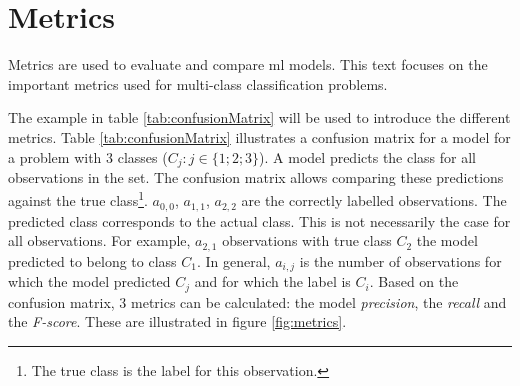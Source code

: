 \section{Metrics}
\par{Metrics are used to evaluate and compare \acrlong{ml} models.
This text focuses on the important metrics used for multi-class classification problems.
}
\par{
    The example in table \ref{tab:confusionMatrix} will be used to introduce the different metrics.
    Table \ref{tab:confusionMatrix} illustrates a confusion matrix for a model for a problem with 3 classes ($C_j:j\in \{1;2;3\}$). 
    A model predicts the class for all observations in the set.
    The confusion matrix allows comparing these predictions against the true class\footnote{The true class is the label for this observation.}.
    $a_{0,0}$, $a_{1,1}$, $a_{2,2}$ are the correctly labelled observations. 
The predicted class corresponds to the actual class.
This is not necessarily the case for all observations. For example, $a_{2,1}$ observations with true class $C_2$ the model predicted to belong to class $C_1$.
In general, $a_{i,j}$ is the number of observations for which the model predicted $C_j$ and for which the label is $C_i$.
Based on the confusion matrix, 3 metrics can be calculated: the model \textit{precision}, the \textit{recall} and the \textit{F-score}. These are illustrated in figure \ref{fig:metrics}.
}

